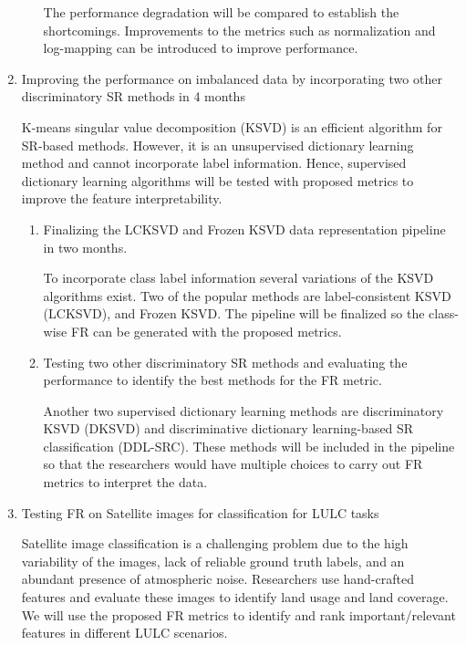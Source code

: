 \begin{enumerate}
\begin{enumerate}
        The performance degradation will be compared to establish the shortcomings. Improvements to the metrics such as normalization and log-mapping can be introduced to improve performance.
        
    \end{enumerate}
    
    \item Improving the performance on imbalanced data by incorporating two other discriminatory SR methods in 4 months
    
    K-means singular value decomposition (KSVD)\cite{Aharon2006} is an efficient algorithm for SR-based methods. However, it is an unsupervised dictionary learning method and cannot incorporate label information. Hence, supervised dictionary learning algorithms will be tested with proposed metrics to improve the feature interpretability.
    
    \begin{enumerate}
    
        \item Finalizing the LCKSVD and Frozen KSVD data representation pipeline in two months.
        
        To incorporate class label information several variations of the KSVD algorithms exist. Two of the popular methods are label-consistent KSVD (LCKSVD)\cite{Jiang2011}, and Frozen KSVD\cite{Carroll2017}. The pipeline will be finalized so the class-wise FR can be generated with the proposed metrics. 
        
        \item Testing two other discriminatory SR methods and evaluating the performance to identify the best methods for the FR metric.
        
        Another two supervised dictionary learning methods are discriminatory KSVD (DKSVD)\cite{Zhang2010} and discriminative dictionary learning-based SR classification (DDL-SRC)\cite{Kong2021}. These methods will be included in the pipeline so that the researchers would have multiple choices to carry out FR metrics to interpret the data.
        
    \end{enumerate}
    
    \item Testing FR on Satellite images for classification for LULC tasks
    
    Satellite image classification is a challenging problem due to the high variability of the images, lack of reliable ground truth labels, and an abundant presence of atmospheric noise. Researchers use hand-crafted features and evaluate these images to identify land usage and land coverage. We will use the proposed FR metrics to identify and rank important/relevant features in different LULC scenarios. 
    

\end{enumerate}
